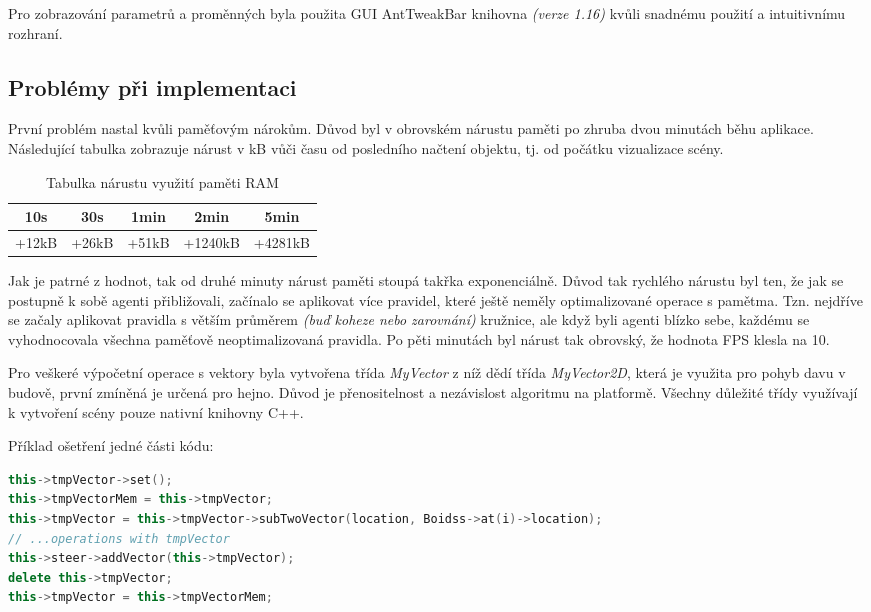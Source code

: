\documentclass[czech,public,dept460,male,cpdeclaration]{diploma}
\begin{document}
Pro zobrazování parametrů a proměnných byla použita GUI AntTweakBar knihovna \textit{(verze 1.16)} \cite{linkToAntTweakBar} kvůli snadnému použití a intuitivnímu rozhraní.

\subsection{Problémy při implementaci}

První problém nastal kvůli paměťovým nárokům. Důvod byl v obrovském nárustu paměti po zhruba dvou minutách běhu aplikace. Následující tabulka zobrazuje nárust v kB vůči času od posledního načtení objektu, tj. od počátku vizualizace scény.

\begin{table}[H]
	\centering
	\caption{Tabulka nárustu využití paměti RAM}
	\label{tab:ramoptimalization}
	\renewcommand{\arraystretch}{1.5}
	\begin{tabular}{| c | c | c | c | c |}
		\hline
		10s & 30s & 1min & 2min & 5min\\\hline
		+12kB & +26kB & +51kB & +1240kB & +4281kB\\
		\hline
	\end{tabular}
\end{table}

Jak je patrné z hodnot, tak od druhé minuty nárust paměti stoupá takřka exponenciálně. Důvod tak rychlého nárustu byl ten, že jak se postupně k sobě agenti přibližovali, začínalo se aplikovat více pravidel, které ještě neměly optimalizované operace s pamětma. Tzn. nejdříve se začaly aplikovat pravidla s větším průměrem \textit{(buď koheze nebo zarovnání)} kružnice, ale když byli agenti blízko sebe, každému se vyhodnocovala všechna paměťově neoptimalizovaná pravidla.
Po pěti minutách byl nárust tak obrovský, že hodnota FPS klesla na 10. 

Pro veškeré výpočetní operace s vektory byla vytvořena třída \textit{MyVector} z níž dědí třída \textit{MyVector2D}, která je využita pro pohyb davu v budově, první zmíněná je určená pro hejno. Důvod je přenositelnost a nezávislost algoritmu na platformě. Všechny důležité třídy využívají k vytvoření scény pouze nativní knihovny C++.

Příklad ošetření jedné části kódu:

\begin{lstlisting}[language=c++,label=src:memory elimination,caption=Ukázka eliminace nárustu paměti]
this->tmpVector->set();
this->tmpVectorMem = this->tmpVector;
this->tmpVector = this->tmpVector->subTwoVector(location, Boidss->at(i)->location);
// ...operations with tmpVector
this->steer->addVector(this->tmpVector);
delete this->tmpVector;
this->tmpVector = this->tmpVectorMem;
\end{lstlisting}
\end{document}
